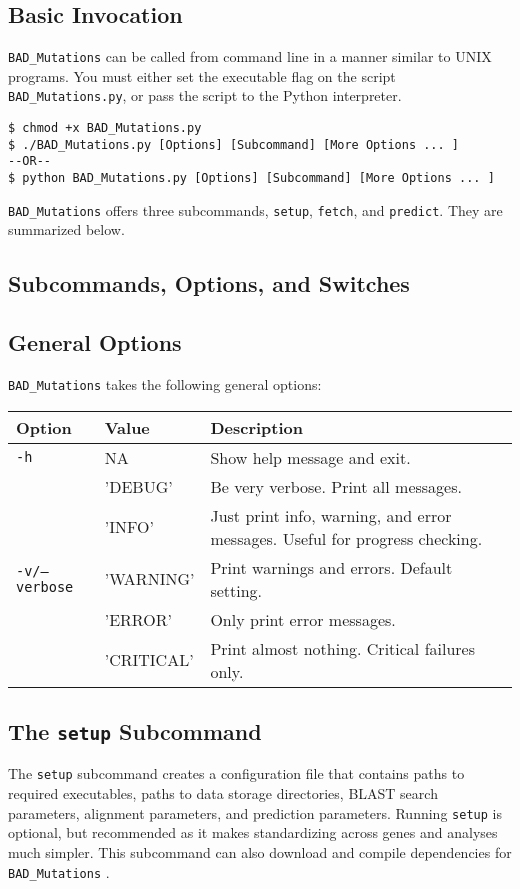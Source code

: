 \documentclass[12pt]{article}
\newcommand{\BM}{\texttt{BAD\_Mutations} }
\begin{document}
\subsection*{Basic Invocation}
\par \BM can be called from command line in a manner similar to UNIX programs.
You must either set the executable flag on the script \texttt{BAD\_Mutations.py},
or pass the script to the Python interpreter.
\begin{Verbatim}[frame=single, fontsize=\small, rulecolor=\color{gray}]
$ chmod +x BAD_Mutations.py
$ ./BAD_Mutations.py [Options] [Subcommand] [More Options ... ]
--OR--
$ python BAD_Mutations.py [Options] [Subcommand] [More Options ... ]
\end{Verbatim}
\par \BM offers three subcommands, \texttt{setup}, \texttt{fetch}, and
\texttt{predict}. They are summarized below.

\subsection*{Subcommands, Options, and Switches}
\subsection*{General Options}
\par \BM takes the following general options:
\begin{table}[h]
    \centering
    \begin{tabular}{p{105pt} l p{260pt}}
    \toprule
    Option & Value & Description \\
    \midrule
    \texttt{-h} & NA & Show help message and exit. \\
    \midrule
    & 'DEBUG' & Be very verbose. Print all messages.\\ \cmidrule{2-3}
    & 'INFO' & Just print info, warning, and error messages. Useful for progress checking.\\ \cmidrule{2-3}
    \texttt{-v/--verbose} & 'WARNING' & Print warnings and errors. Default setting. \\ \cmidrule{2-3}
    & 'ERROR' & Only print error messages. \\ \cmidrule{2-3}
    & 'CRITICAL' & Print almost nothing. Critical failures only. \\
    \bottomrule
    \end{tabular}
\end{table}
\subsection*{The \texttt{setup} Subcommand}
\par The \texttt{setup} subcommand creates a configuration file that contains
paths to required executables, paths to data storage directories, BLAST search
parameters, alignment parameters, and prediction parameters. Running
\texttt{setup} is optional, but recommended as it makes standardizing across
genes and analyses much simpler. This subcommand can also download and compile
dependencies for \BM.
\end{document}
